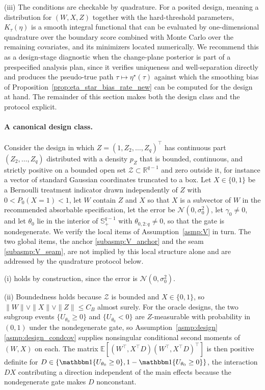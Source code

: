\documentclass[11pt]{article}
\theoremstyle{definition}
\theoremstyle{plain}
\newcommand{\E}{\mathbb{E}}
\newcommand{\R}{\mathbb{R}}
\begin{document}
(iii) The conditions are checkable by quadrature. For a posited design, meaning a distribution for $(W,X,Z)$ together with the hard-threshold parameters, $K_\tau(\eta)$ is a smooth integral functional that can be evaluated by one-dimensional quadrature over the boundary score combined with Monte Carlo over the remaining covariates, and its minimizers located numerically. We recommend this as a design-stage diagnostic when the change-plane posterior is part of a prespecified analysis plan, since it verifies uniqueness and well-separation directly and produces the pseudo-true path $\tau\mapsto\eta^\star(\tau)$ against which the smoothing bias of Proposition~\ref{prop:eta_star_bias_rate_new} can be computed for the design at hand. The remainder of this section makes both the design class and the protocol explicit.

\paragraph{A canonical design class.} Consider the design in which $Z=(1,Z_2,\dots,Z_q)^\top$ has continuous part $(Z_2,\dots,Z_q)$ distributed with a density $p_Z$ that is bounded, continuous, and strictly positive on a bounded open set $\mathcal Z\subset\R^{q-1}$ and zero outside it, for instance a vector of standard Gaussian coordinates truncated to a box. Let $X\in\{0,1\}$ be a Bernoulli treatment indicator drawn independently of $Z$ with $0<P_0(X=1)<1$, let $W$ contain $Z$ and $X$ so that $X$ is a subvector of $W$ in the recommended absorbable specification, let the error be $\mathcal N(0,\sigma_0^2)$, let $\gamma_0\neq0$, and let $\theta_0$ lie in the interior of $\mathbb S^{q-1}_+$ with $\theta_{0,2:q}\neq0$, so that the gate is nondegenerate. We verify the local items of Assumption~\ref{asmp:V} in turn. The two global items, the anchor \ref{subasmp:V_anchor} and the seam \ref{subasmp:V_seam}, are not implied by this local structure alone and are addressed by the quadrature protocol below.

(i) holds by construction, since the error is $\mathcal N(0,\sigma_0^2)$.

(ii) Boundedness holds because $\mathcal Z$ is bounded and $X\in\{0,1\}$, so $\|W\|\vee\|X\|\vee\|Z\|\le C_B$ almost surely. For the oracle designs, the two subgroup events $\{U_{\theta_0}\ge0\}$ and $\{U_{\theta_0}<0\}$ are $Z$-measurable with probability in $(0,1)$ under the nondegenerate gate, so Assumption~\ref{asmp:design}\ref{asmp:design_condcov} supplies nonsingular conditional second moments of $(W,X)$ on each. The matrix $\E[(W^\top,X^\top D)(W^\top,X^\top D)^\top]$ is then positive definite for $D\in\{\mathbbm 1\{U_{\theta_0}\ge0\},1-\mathbbm 1\{U_{\theta_0}\ge0\}\}$, the interaction $DX$ contributing a direction independent of the main effects because the nondegenerate gate makes $D$ nonconstant.
\end{document}

